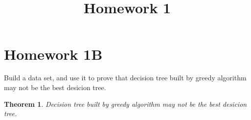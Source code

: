 \documentclass{article} %
\title{Homework 1}
\newtheorem{theorem}{Theorem}
\begin{document}
\maketitle
%


\section{Homework 1B}







    

Build a data set, and use it to prove that decision tree built by greedy algorithm may not be the best desicion tree.

\begin{theorem}

    Decision tree built by greedy algorithm may not be the best desicion tree.

\end{theorem}
\end{document}
